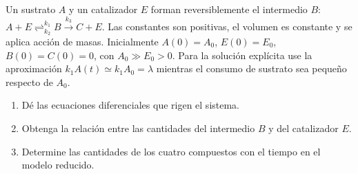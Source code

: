 Un sustrato $A$ y un catalizador $E$ forman reversiblemente el intermedio $B$: $A+E\mathrel{\mathop{\rightleftharpoons}^{k_1}_{k_2}}B\xrightarrow{k_3}C+E$. Las constantes son positivas, el volumen es constante y se aplica acción de masas. Inicialmente $A(0)=A_0$, $E(0)=E_0$, $B(0)=C(0)=0$, con $A_0\gg E_0>0$. Para la solución explícita use la aproximación $k_1A(t)\simeq k_1A_0=\lambda$ mientras el consumo de sustrato sea pequeño respecto de $A_0$.

\begin{enumerate}[label=(\alph*),ref=\alph*,leftmargin=*]
\item Dé las ecuaciones diferenciales que rigen el sistema.
\item Obtenga la relación entre las cantidades del intermedio $B$ y del catalizador $E$.
\item Determine las cantidades de los cuatro compuestos con el tiempo en el modelo reducido.
\end{enumerate}
